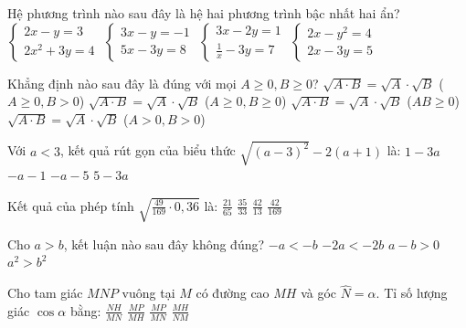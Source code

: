 \documentclass[12pt,a4paper]{article}
\begin{document}
\begin{ex}
Hệ phương trình nào sau đây là hệ hai phương trình bậc nhất hai ẩn?
\choice
{$\begin{cases} 2x - y = 3 \\ 2x^2 + 3y = 4 \end{cases}$}
{\True $\begin{cases} 3x - y = -1 \\ 5x - 3y = 8 \end{cases}$}
{$\begin{cases} 3x - 2y = 1 \\ \frac{1}{x} - 3y = 7 \end{cases}$}
{$\begin{cases} 2x - y^2 = 4 \\ 2x - 3y = 5 \end{cases}$}
\end{ex}

\begin{ex}
Khẳng định nào sau đây là đúng với mọi $A \ge 0, B \ge 0$?
\choice
{$\sqrt{A \cdot B} = \sqrt{A} \cdot \sqrt{B}$ ($A \ge 0, B > 0$)}
{\True $\sqrt{A \cdot B} = \sqrt{A} \cdot \sqrt{B}$ ($A \ge 0, B \ge 0$)}
{$\sqrt{A \cdot B} = \sqrt{A} \cdot \sqrt{B}$ ($AB \ge 0$)}
{$\sqrt{A \cdot B} = \sqrt{A} \cdot \sqrt{B}$ ($A > 0, B > 0$)}
\end{ex}

\begin{ex}
Với $a < 3$, kết quả rút gọn của biểu thức $\sqrt{(a - 3)^2} - 2(a + 1)$ là:
\choice
{\True $1 - 3a$}
{$-a - 1$}
{$-a - 5$}
{$5 - 3a$}
\end{ex}

\begin{ex}
Kết quả của phép tính $\sqrt{\frac{49}{169} \cdot 0{,}36}$ là:
\choice
{\True $\frac{21}{65}$}
{$\frac{35}{33}$}
{$\frac{42}{13}$}
{$\frac{42}{169}$}
\end{ex}

\begin{ex}
Cho $a > b$, kết luận nào sau đây không đúng?
\choice
{$-a < -b$}
{$-2a < -2b$}
{$a - b > 0$}
{\True $a^2 > b^2$}
\end{ex}

\begin{ex}
Cho tam giác $MNP$ vuông tại $M$ có đường cao $MH$ và góc $\widehat{N} = \alpha$. Tỉ số lượng giác $\cos \alpha$ bằng:
\choice
{\True $\frac{NH}{MN}$}
{$\frac{MP}{MH}$}
{$\frac{MP}{MN}$}
{$\frac{MH}{NM}$}
\end{ex}
\end{document}
